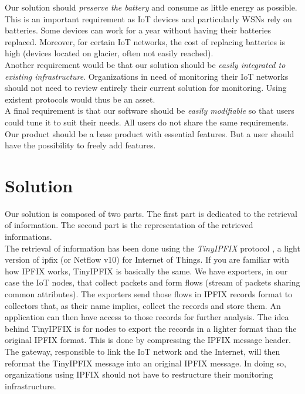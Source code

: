 Our solution should \textit{preserve the battery} and consume as little energy as possible. This is an important requirement as IoT devices and particularly WSNs rely on batteries. Some devices can work for a year without having their batteries replaced. Moreover, for certain IoT networks, the cost of replacing batteries is high (devices located on glacier, often not easily reached).\\

Another requirement would be that our solution should be \textit{easily integrated to existing infrastructure}. Organizations in need of monitoring their IoT networks should not need to review entirely their current solution for monitoring. Using existent protocols would thus be an asset. \\

A final requirement is that our software should be \textit{easily modifiable} so that users could tune it to suit their needs. All users do not share the same requirements. Our product should be a base product with essential features. But a user should have the possibility to freely add features.

\section*{Solution}

Our solution is composed of two parts. The first part is dedicated to the retrieval of information. The second part is the representation of the retrieved informations. \\

The retrieval of information has been done using the \textit{TinyIPFIX} protocol \cite{schmitt2016tinyipfix}, a light version of \acrshort{ipfix} (or Netflow v10) for Internet of Things. If you are familiar with how IPFIX works, TinyIPFIX is basically the same. We have exporters, in our case the IoT nodes, that collect packets and form flows (stream of packets sharing common attributes). The exporters send those flows in IPFIX records format to collectors that, as their name implies, collect the records and store them. An application can then have access to those records for further analysis. The idea behind TinyIPFIX is for nodes to export the records in a lighter format than the original IPFIX format. This is done by compressing the IPFIX message header. The gateway, responsible to link the IoT network and the Internet, will then reformat the TinyIPFIX message into an original IPFIX message. In doing so, organizations using IPFIX should not have to restructure their monitoring infrastructure. \\


